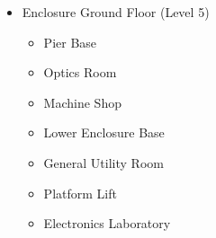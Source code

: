\begin{small}
\begin{itemize}
	\item Enclosure Ground Floor (Level 5)
		\begin{itemize}
		\item Pier Base
		\item Optics Room
		\item Machine Shop
		\item Lower Enclosure Base
		\item General Utility Room
		\item Platform Lift
		\item Electronics Laboratory
		\end{itemize}

\end{itemize}
\end{small}
